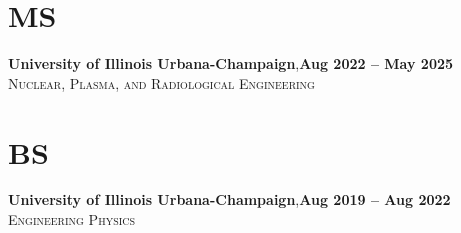 \documentclass[margin,line]{resume}
\begin{document}
\begin{resume}
    \section{\mysidestyle MS}
    \textbf{University of Illinois Urbana-Champaign},\hfill\textbf{Aug 2022 -- May 2025}\\
    \textsc{Nuclear, Plasma, and Radiological Engineering}\\
    \vspace{-5.5mm}
    \section{\mysidestyle BS}
    \textbf{University of Illinois Urbana-Champaign},\hfill\textbf{Aug 2019 -- Aug 2022}\\%
    \textsc{Engineering Physics}\\
    \vspace{-5mm}




\end{resume}
\end{document}
